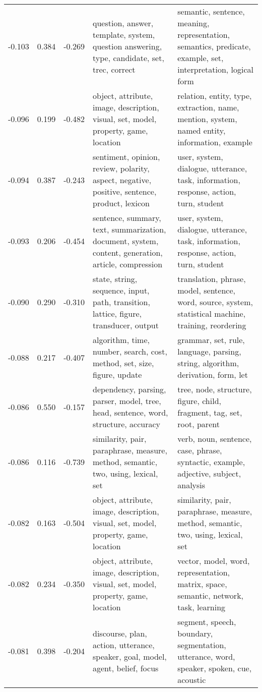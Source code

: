 \begin{tabular}{cccp{5cm}p{5cm}}
-0.103 & 0.384 & -0.269 & question, answer, template, system, question answering, type, candidate, set, trec, correct & semantic, sentence, meaning, representation, semantics, predicate, example, set, interpretation, logical form \\
-0.096 & 0.199 & -0.482 & object, attribute, image, description, visual, set, model, property, game, location & relation, entity, type, extraction, name, mention, system, named entity, information, example \\
-0.094 & 0.387 & -0.243 & sentiment, opinion, review, polarity, aspect, negative, positive, sentence, product, lexicon & user, system, dialogue, utterance, task, information, response, action, turn, student \\
-0.093 & 0.206 & -0.454 & sentence, summary, text, summarization, document, system, content, generation, article, compression & user, system, dialogue, utterance, task, information, response, action, turn, student \\
-0.090 & 0.290 & -0.310 & state, string, sequence, input, path, transition, lattice, figure, transducer, output & translation, phrase, model, sentence, word, source, system, statistical machine, training, reordering \\
-0.088 & 0.217 & -0.407 & algorithm, time, number, search, cost, method, set, size, figure, update & grammar, set, rule, language, parsing, string, algorithm, derivation, form, let \\
-0.086 & 0.550 & -0.157 & dependency, parsing, parser, model, tree, head, sentence, word, structure, accuracy & tree, node, structure, figure, child, fragment, tag, set, root, parent \\
-0.086 & 0.116 & -0.739 & similarity, pair, paraphrase, measure, method, semantic, two, using, lexical, set & verb, noun, sentence, case, phrase, syntactic, example, adjective, subject, analysis \\
-0.082 & 0.163 & -0.504 & object, attribute, image, description, visual, set, model, property, game, location & similarity, pair, paraphrase, measure, method, semantic, two, using, lexical, set \\
-0.082 & 0.234 & -0.350 & object, attribute, image, description, visual, set, model, property, game, location & vector, model, word, representation, matrix, space, semantic, network, task, learning \\
-0.081 & 0.398 & -0.204 & discourse, plan, action, utterance, speaker, goal, model, agent, belief, focus & segment, speech, boundary, segmentation, utterance, word, speaker, spoken, cue, acoustic \\

\end{tabular}

